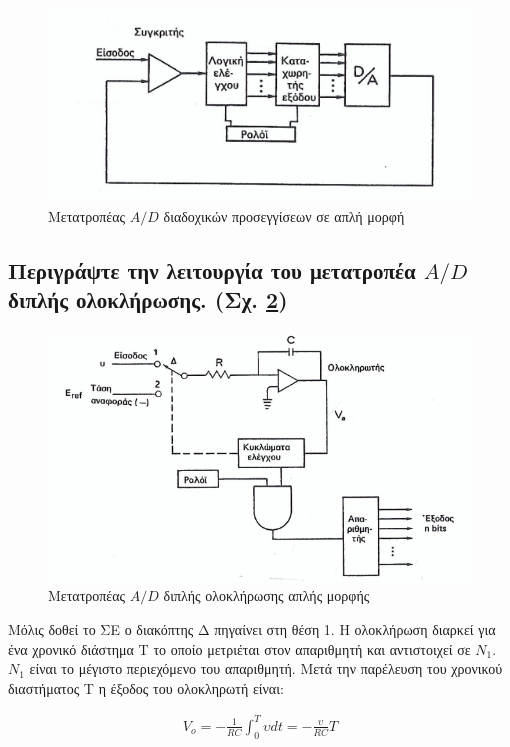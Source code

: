 \documentclass{article}
\begin{document}
\begin{figure}[h!]
    \includegraphics[width=\linewidth]{metatropeasdiadoxikwnproseggisewn.png}
    \caption{Μετατροπέας $A/D$ διαδοχικών προσεγγίσεων σε απλή μορφή}
    \label{addiadoxikwn}
\end{figure}

\subsection{Περιγράψτε την λειτουργία του μετατροπέα $A/D$ διπλής 
ολοκλήρωσης. (Σχ. \ref{addiplisolok})}

\begin{figure}[h!]
    \includegraphics[width=\linewidth]{AD2olok.png}
    \caption{Μετατροπέας $A/D$ διπλής ολοκλήρωσης απλής μορφής}
    \label{addiplisolok}
\end{figure}
Μόλις δοθεί το ΣΕ ο διακόπτης Δ πηγαίνει στη θέση 1. Η ολοκλήρωση διαρκεί για ένα χρονικό διάστημα Τ το οποίο μετριέται στον απαριθμητή και αντιστοιχεί σε $N_1$. $N_1$ είναι το μέγιστο 
περιεχόμενο του απαριθμητή. Μετά την παρέλευση του χρονικού διαστήματος Τ η έξοδος του ολοκληρωτή είναι: 

\begin{align*}
    V_o=-\frac{1}{RC}\int^{T}_{0} \upsilon dt=-\frac{\upsilon}{RC}T
\end{align*}
\end{document}
